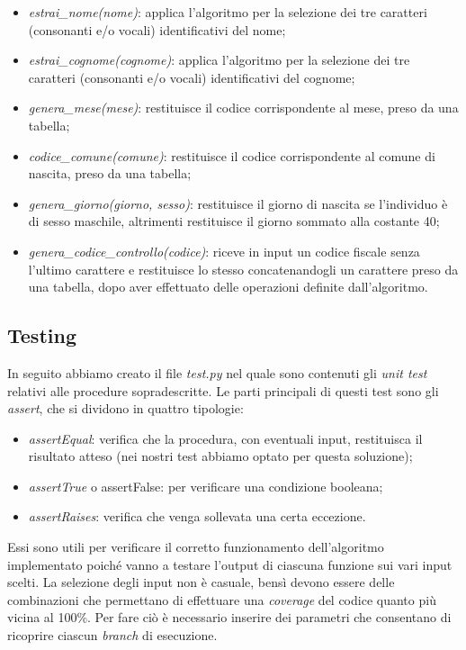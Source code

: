 \documentclass[a4paper, 12pt]{article}
\begin{document}
	\begin{itemize}
		\item \textit{estrai\_nome(nome)}: applica l'algoritmo per la selezione dei tre caratteri (consonanti e/o vocali) identificativi del nome;
		\item \textit{estrai\_cognome(cognome)}: applica l'algoritmo per la selezione dei tre caratteri (consonanti e/o vocali) identificativi del cognome;
		\item \textit{genera\_mese(mese)}: restituisce il codice corrispondente al mese, preso da una tabella;
		\item \textit{codice\_comune(comune)}: restituisce il codice corrispondente al comune di nascita, preso da una tabella;
		\item \textit{genera\_giorno(giorno, sesso)}: restituisce il giorno di nascita se l'individuo è di sesso maschile, altrimenti restituisce il giorno sommato alla costante 40;
		
		\item \textit{genera\_codice\_controllo(codice)}: riceve in input un codice fiscale senza l'ultimo carattere e restituisce lo stesso concatenandogli un carattere preso da una tabella, dopo aver effettuato delle operazioni definite dall'algoritmo.
	\end{itemize}
	
	\subsection*{Testing}
	In seguito abbiamo creato il file \textit{test.py} nel quale sono contenuti gli \textit{unit test} relativi alle procedure sopradescritte. Le parti principali di questi test sono gli \textit{assert}, che si dividono in quattro tipologie:
	\begin{itemize}
		\item \textit{assertEqual}: verifica che la procedura, con eventuali input, restituisca il risultato atteso (nei nostri test abbiamo optato per questa soluzione);
		\item \textit{assertTrue} o {assertFalse}: per verificare una condizione booleana;
		\item \textit{assertRaises}: verifica che venga sollevata una certa eccezione.
	\end{itemize}
	\noindent
	Essi sono utili per verificare il corretto funzionamento dell'algoritmo implementato poiché vanno a testare l'output di ciascuna funzione sui vari input scelti. La selezione degli input non è casuale, bensì devono essere delle combinazioni che permettano di effettuare una \textit{coverage} del codice quanto più vicina al 100\%. Per fare ciò è necessario inserire dei parametri che consentano di ricoprire ciascun \textit{branch} di esecuzione.
	
\end{document}
